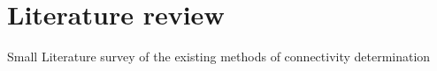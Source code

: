 \section{Literature review}

Small Literature survey of the existing methods of connectivity determination

\cite{COLAS2013586}
\cite{SHARMA2018546}
\cite{SUNIL2020152457}